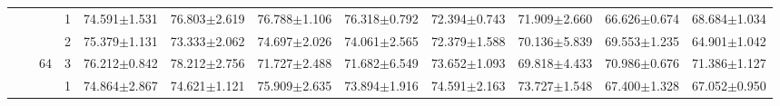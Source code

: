 \begin{table}[htpb]
{\begin{tabular}{c|c|c|c|ll|ll|ll|ll}
                                 &                                                                                 &                                                                                        & 1                                                                                         & 74.591$\pm$1.531                        & 76.803$\pm$2.619                        & 76.788$\pm$1.106                        & 76.318$\pm$0.792                        & 72.394$\pm$0.743                        & 71.909$\pm$2.660                        & \multicolumn{1}{r}{66.626$\pm$0.674}    & \multicolumn{1}{r}{68.684$\pm$1.034}   \\
                                 &                                                                                 &                                                                                        & 2                                                                                         & 75.379$\pm$1.131                        & 73.333$\pm$2.062                        & 74.697$\pm$2.026                        & 74.061$\pm$2.565                        & 72.379$\pm$1.588                        & 70.136$\pm$5.839                        & \multicolumn{1}{r}{69.553$\pm$1.235}    & \multicolumn{1}{r}{64.901$\pm$1.042}   \\
                                 &                                                                                 & \multirow{-3}{*}{64}                                                                   & 3                                                                                         & 76.212$\pm$0.842                        & 78.212$\pm$2.756                        & 71.727$\pm$2.488                        & 71.682$\pm$6.549                        & 73.652$\pm$1.093                        & 69.818$\pm$4.433                        & \multicolumn{1}{r}{70.986$\pm$0.676}    & \multicolumn{1}{r}{71.386$\pm$1.127}   \\ \cline{3-12} 
                                 &                                                                                 &                                                                                        & 1                                                                                         & 74.864$\pm$2.867                        & 74.621$\pm$1.121                        & 75.909$\pm$2.635                        & 73.894$\pm$1.916                        & 74.591$\pm$2.163                        & 73.727$\pm$1.548                        & \multicolumn{1}{r}{67.400$\pm$1.328}    & \multicolumn{1}{r}{67.052$\pm$0.950}   \\

\end{tabular}}
\end{table}
